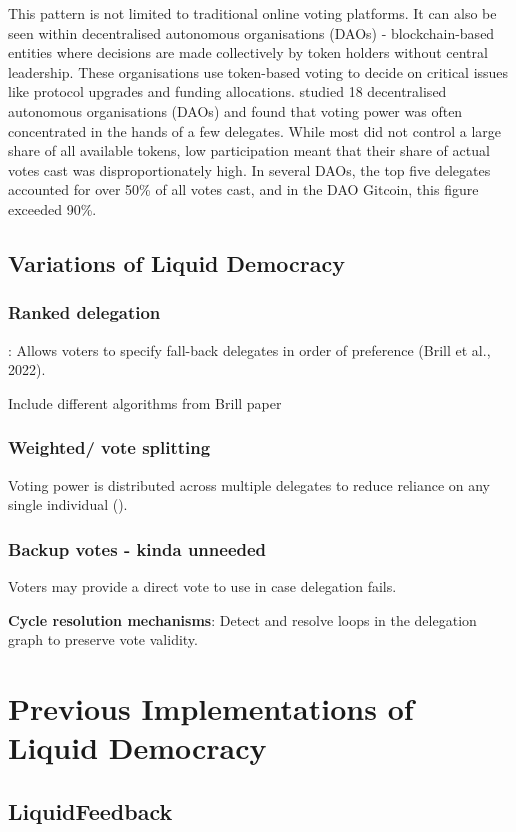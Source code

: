 This pattern is not limited to traditional online voting platforms. It can also be seen within decentralised autonomous organisations (DAOs) - blockchain-based entities where decisions are made collectively by token holders without central leadership. These organisations use token-based voting to decide on critical issues like protocol upgrades and funding allocations. \cite{hallWhatHappensWhen2024} studied 18 decentralised autonomous organisations (DAOs) and found that voting power was often concentrated in the hands of a few delegates. While most did not control a large share of all available tokens, low participation meant that their share of actual votes cast was disproportionately high. In several DAOs, the top five delegates accounted for over 50\% of all votes cast, and in the DAO Gitcoin, this figure exceeded 90\%.
\subsection{Variations of Liquid Democracy}

\subsubsection{Ranked delegation}: Allows voters to specify fall-back delegates in order of preference (Brill et al., 2022).

Include different algorithms from Brill paper

\subsubsection{Weighted/ vote splitting}
Voting power is distributed across multiple delegates to reduce reliance on any single individual (\cite{golz_fluid_2021}).

\subsubsection{Backup votes - kinda unneeded}
Voters may provide a direct vote to use in case delegation fails.

\textbf{Cycle resolution mechanisms}: Detect and resolve loops in the delegation graph to preserve vote validity.

\section{Previous Implementations of Liquid Democracy}
\subsection{LiquidFeedback}
